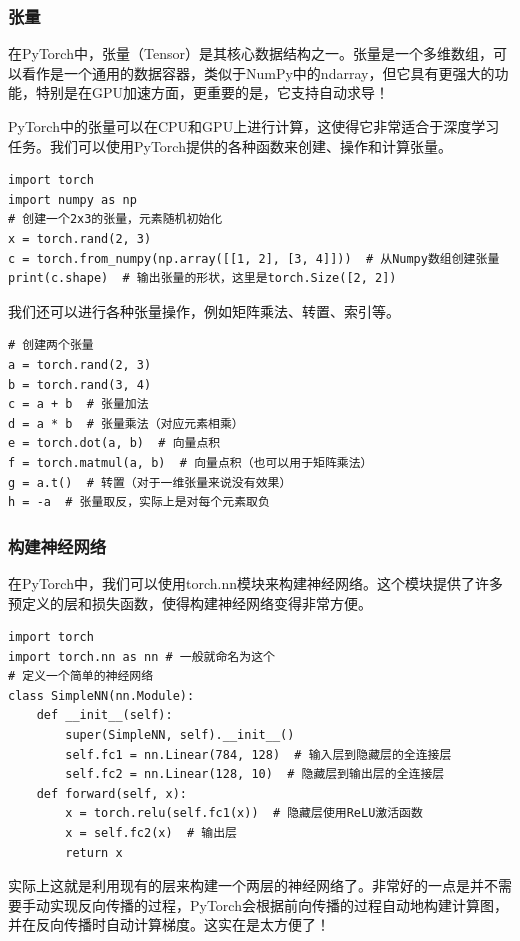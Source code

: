 \documentclass[fontset=none]{ctexart}
\begin{document}
\subsubsection{张量}

在PyTorch中，张量（Tensor）是其核心数据结构之一。张量是一个多维数组，可以看作是一个通用的数据容器，类似于NumPy中的ndarray，但它具有更强大的功能，特别是在GPU加速方面，更重要的是，它支持自动求导！

PyTorch中的张量可以在CPU和GPU上进行计算，这使得它非常适合于深度学习任务。我们可以使用PyTorch提供的各种函数来创建、操作和计算张量。
\begin{verbatim}
import torch
import numpy as np
# 创建一个2x3的张量，元素随机初始化
x = torch.rand(2, 3)
c = torch.from_numpy(np.array([[1, 2], [3, 4]]))  # 从Numpy数组创建张量
print(c.shape)  # 输出张量的形状，这里是torch.Size([2, 2])
\end{verbatim}

我们还可以进行各种张量操作，例如矩阵乘法、转置、索引等。
\begin{verbatim}
# 创建两个张量
a = torch.rand(2, 3)
b = torch.rand(3, 4)
c = a + b  # 张量加法
d = a * b  # 张量乘法（对应元素相乘）
e = torch.dot(a, b)  # 向量点积
f = torch.matmul(a, b)  # 向量点积（也可以用于矩阵乘法）
g = a.t()  # 转置（对于一维张量来说没有效果）
h = -a  # 张量取反，实际上是对每个元素取负
\end{verbatim}

\subsubsection{构建神经网络}

在PyTorch中，我们可以使用torch.nn模块来构建神经网络。这个模块提供了许多预定义的层和损失函数，使得构建神经网络变得非常方便。
\begin{verbatim}
import torch
import torch.nn as nn # 一般就命名为这个
# 定义一个简单的神经网络
class SimpleNN(nn.Module):
    def __init__(self):
        super(SimpleNN, self).__init__()
        self.fc1 = nn.Linear(784, 128)  # 输入层到隐藏层的全连接层
        self.fc2 = nn.Linear(128, 10)  # 隐藏层到输出层的全连接层
    def forward(self, x):
        x = torch.relu(self.fc1(x))  # 隐藏层使用ReLU激活函数
        x = self.fc2(x)  # 输出层
        return x
\end{verbatim}

实际上这就是利用现有的层来构建一个两层的神经网络了。非常好的一点是并不需要手动实现反向传播的过程，PyTorch会根据前向传播的过程自动地构建计算图，并在反向传播时自动计算梯度。这实在是太方便了！
\end{document}
